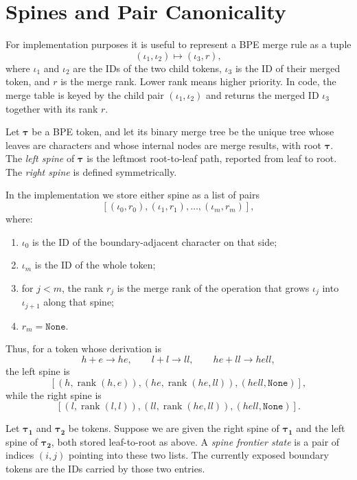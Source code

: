 \section{Spines and Pair Canonicality}
\label{sec:bpe-spines}

For implementation purposes it is useful to represent a BPE merge rule as a tuple
\[
(\iota_1,\iota_2) \mapsto (\iota_3, r),
\]
where $\iota_1$ and $\iota_2$ are the IDs of the two child tokens, $\iota_3$ is the ID of
their merged token, and $r$ is the merge rank. Lower rank means higher priority.
In code, the merge table is keyed by the child pair $(\iota_1,\iota_2)$ and returns the merged
ID $\iota_3$ together with its rank $r$.

\begin{definition}
    Let $\boldsymbol{\tau}$ be a BPE token, and let its binary merge tree be the unique tree whose
    leaves are characters and whose internal nodes are merge results, with root $\boldsymbol{\tau}$.
    The \emph{left spine} of $\boldsymbol{\tau}$ is the leftmost root-to-leaf path, reported from leaf to root.
    The \emph{right spine} is defined symmetrically.
\end{definition}

In the implementation we store either spine as a list of pairs
\[
[(\iota_0, r_0), (\iota_1, r_1), \ldots, (\iota_m, r_m)],
\]
where:
\begin{enumerate}
    \item $\iota_0$ is the ID of the boundary-adjacent character on that side;
    \item $\iota_m$ is the ID of the whole token;
    \item for $j < m$, the rank $r_j$ is the merge rank of the operation that grows $\iota_j$
    into $\iota_{j+1}$ along that spine;
    \item $r_m = \texttt{None}$.
\end{enumerate}

Thus, for a token whose derivation is
\[
h+e \to he,
\qquad
l+l \to ll,
\qquad
he+ll \to hell,
\]
the left spine is
\[
[(h,\operatorname{rank}(h,e)), (he,\operatorname{rank}(he,ll)), (hell,\texttt{None})],
\]
while the right spine is
\[
[(l,\operatorname{rank}(l,l)), (ll,\operatorname{rank}(he,ll)), (hell,\texttt{None})].
\]

\begin{definition}
    Let $\boldsymbol{\tau_1}$ and $\boldsymbol{\tau_2}$ be tokens.
    Suppose we are given the right spine of $\boldsymbol{\tau_1}$ and the left spine of
    $\boldsymbol{\tau_2}$, both stored leaf-to-root as above.
    A \emph{spine frontier state} is a pair of indices $(i,j)$ pointing into these two lists.
    The currently exposed boundary tokens are the IDs carried by those two entries.
\end{definition}

